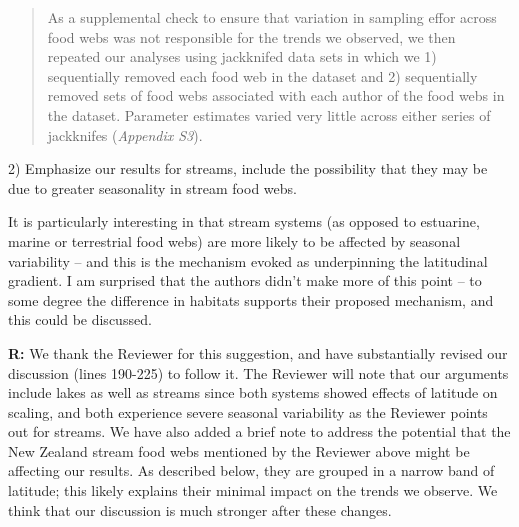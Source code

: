 \documentclass[12pt]{letter}
\newenvironment{refquote}{\bigskip \begin{it}}{\end{it}\smallskip}
\begin{document}
  \begin{quotation}

    As a supplemental check to ensure that variation in sampling effor across
    food webs was not responsible for the trends we observed, we then repeated
    our analyses using jackknifed data sets in which we 1) sequentially removed
    each food web in the dataset and 2) sequentially removed sets of food webs 
    associated with each author of the food webs in the dataset. Parameter 
    estimates varied very little across either series of jackknifes (\emph{Appendix S3}).

  \end{quotation}


   2) Emphasize our results for streams, include the possibility that they
   may be due to greater seasonality in stream food webs. 

  \begin{refquote}

    It is particularly interesting in that stream systems (as opposed to
    estuarine, marine or terrestrial food webs) are more likely to be affected
    by seasonal variability – and this is the mechanism evoked as underpinning
    the latitudinal gradient. I am surprised that the authors didn’t make more
    of this point – to some degree the difference in habitats supports their
    proposed mechanism, and this could be discussed.

  \end{refquote}


  \textbf{R:} We thank the Reviewer for this suggestion, 
  and have substantially revised our discussion (lines 
  190-225) to follow it. The Reviewer will note that our 
  arguments include lakes as well as streams since both 
  systems showed effects of latitude on scaling, and both 
  experience severe seasonal variability as the Reviewer
  points out for streams. We have also added a brief note 
  to address the potential that the New Zealand stream food 
  webs mentioned by the Reviewer above might be affecting 
  our results. As described below, they are grouped in a 
  narrow band of latitude; this likely explains their 
  minimal impact on the trends we observe. We think that 
  our discussion is much stronger after these changes.
\end{document}
